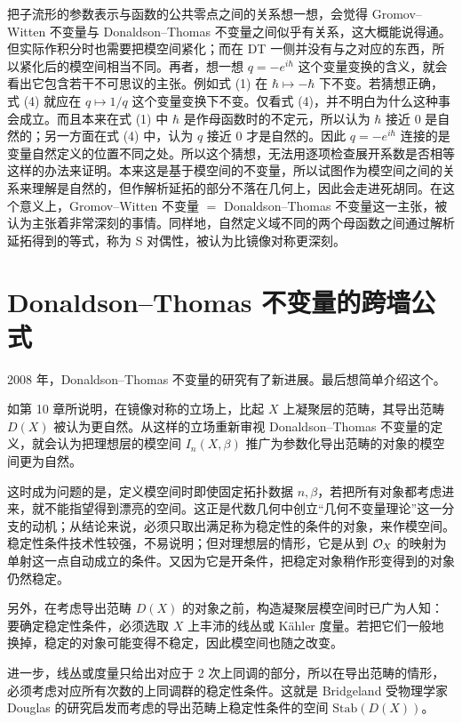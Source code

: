 把子流形的参数表示与函数的公共零点之间的关系想一想，会觉得 Gromov--Witten 不变量与 Donaldson--Thomas 不变量之间似乎有关系，这大概能说得通。但实际作积分时也需要把模空间紧化；而在 DT 一侧并没有与之对应的东西，所以紧化后的模空间相当不同。再者，想一想 $q=-e^{i\hbar}$ 这个变量变换的含义，就会看出它包含若干不可思议的主张。例如式 (1) 在 $\hbar\mapsto-\hbar$ 下不变。若猜想正确，式 (4) 就应在 $q\mapsto1/q$ 这个变量变换下不变。仅看式 (4)，并不明白为什么这种事会成立。而且本来在式 (1) 中 $\hbar$ 是作母函数时的不定元，所以认为 $\hbar$ 接近 0 是自然的；另一方面在式 (4) 中，认为 $q$ 接近 0 才是自然的。因此 $q=-e^{i\hbar}$ 连接的是变量自然定义的位置不同之处。所以这个猜想，无法用逐项检查展开系数是否相等这样的办法来证明。本来这是基于模空间的不变量，所以试图作为模空间之间的关系来理解是自然的，但作解析延拓的部分不落在几何上，因此会走进死胡同。在这个意义上，Gromov--Witten 不变量 $=$ Donaldson--Thomas 不变量这一主张，被认为主张着非常深刻的事情。同样地，自然定义域不同的两个母函数之间通过解析延拓得到的等式，称为 S 对偶性，被认为比镜像对称更深刻。

\section{Donaldson--Thomas 不变量的跨墙公式}

2008 年，Donaldson--Thomas 不变量的研究有了新进展。最后想简单介绍这个。

如第 10 章所说明，在镜像对称的立场上，比起 $X$ 上凝聚层的范畴，其导出范畴 $D(X)$ 被认为更自然。从这样的立场重新审视 Donaldson--Thomas 不变量的定义，就会认为把理想层的模空间 $I_n(X,\beta)$ 推广为参数化导出范畴的对象的模空间更为自然。

这时成为问题的是，定义模空间时即使固定拓扑数据 $n,\beta$，若把所有对象都考虑进来，就不能指望得到漂亮的空间。这正是代数几何中创立“几何不变量理论”这一分支的动机；从结论来说，必须只取出满足称为稳定性的条件的对象，来作模空间。稳定性条件技术性较强，不易说明；但对理想层的情形，它是从到 $\mathcal{O}_X$ 的映射为单射这一点自动成立的条件。又因为它是开条件，把稳定对象稍作形变得到的对象仍然稳定。

另外，在考虑导出范畴 $D(X)$ 的对象之前，构造凝聚层模空间时已广为人知：要确定稳定性条件，必须选取 $X$ 上丰沛的线丛或 Kähler 度量。若把它们一般地换掉，稳定的对象可能变得不稳定，因此模空间也随之改变。

进一步，线丛或度量只给出对应于 2 次上同调的部分，所以在导出范畴的情形，必须考虑对应所有次数的上同调群的稳定性条件。这就是 Bridgeland 受物理学家 Douglas 的研究启发而考虑的导出范畴上稳定性条件的空间 $\mathrm{Stab}(D(X))$。

